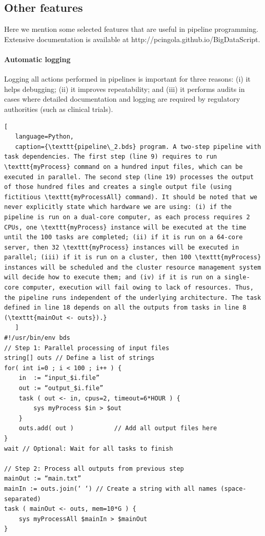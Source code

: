 \subsection{Other features}

Here we mention some selected features that are useful in pipeline programming. Extensive documentation is available at http://pcingola.github.io/BigDataScript.

\paragraph{Automatic logging} Logging all actions performed in pipelines is important for three reasons: (i) it helps debugging; (ii) it improves repeatability; and (iii) it performs audits in cases where detailed documentation and logging are required by regulatory authorities (such as clinical trials).

\begin{lstlisting}[
   language=Python,
   caption={\texttt{pipeline\_2.bds} program. A two-step pipeline with task dependencies. The first step (line 9) requires to run \texttt{myProcess} command on a hundred input files, which can be executed in parallel. The second step (line 19) processes the output of those hundred files and creates a single output file (using fictitious \texttt{myProcessAll} command). It should be noted that we never explicitly state which hardware we are using: (i) if the pipeline is run on a dual-core computer, as each process requires 2 CPUs, one \texttt{myProcess} instance will be executed at the time until the 100 tasks are completed; (ii) if it is run on a 64-core server, then 32 \texttt{myProcess} instances will be executed in parallel; (iii) if it is run on a cluster, then 100 \texttt{myProcess} instances will be scheduled and the cluster resource management system will decide how to execute them; and (iv) if it is run on a single-core computer, execution will fail owing to lack of resources. Thus, the pipeline runs independent of the underlying architecture. The task defined in line 18 depends on all the outputs from tasks in line 8 (\texttt{mainOut <- outs}).}
   ]
#!/usr/bin/env bds
// Step 1: Parallel processing of input files
string[] outs // Define a list of strings 
for( int i=0 ; i < 100 ; i++ ) {
    in  := “input_$i.file”
    out := “output_$i.file”
    task ( out <- in, cpus=2, timeout=6*HOUR ) {
        sys myProcess $in > $out
    }
    outs.add( out )           // Add all output files here
}
wait // Optional: Wait for all tasks to finish

// Step 2: Process all outputs from previous step
mainOut := “main.txt”
mainIn := outs.join(‘ ‘) // Create a string with all names (space-separated)
task ( mainOut <- outs, mem=10*G ) {
    sys myProcessAll $mainIn > $mainOut
}
\end{lstlisting}

